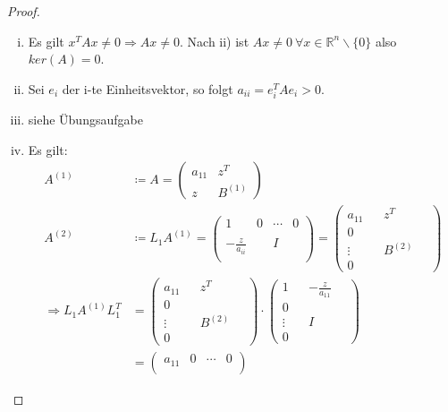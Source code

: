 \documentclass[ngerman,fontsize=11pt, paper=a4, parskip=half, titlepage=true, toc=bib]{scrbook}
\theoremstyle{definition}
\theoremstyle{plain}
\newcommand{\Ren}{\mathds{R}^{n}}
\begin{document}
\begin{proof}~
  \begin{enumerate}[i)]
  \item Es gilt $x^TAx\neq 0\Rightarrow Ax\neq 0$. 
    Nach ii) ist $Ax\neq 0~\forall x\in\Ren\backslash \{0\}$
    also $ker(A)=0$. %
  \item Sei $e_i$ der i-te Einheitsvektor, so folgt $a_{ii} = e_{i}^TAe_i > 0$.
  \item siehe Übungsaufgabe
  \item Es gilt:
    \begin{align*}
      A^{(1)} &\coloneqq A = \begin{pmatrix}
        a_{11} & z^T \\ 
        z			& B^{(1)}
      \end{pmatrix} \\
      A^{(2)}	&\coloneqq L_1 A^{(1)} 
                  = \begin{pmatrix}
                    1 & 0 & \dotsm & 0 \\ \\
                    -\frac{z}{a_{ii}} && I \\ ~
                  \end{pmatrix} 
      = \begin{pmatrix}
        a_{11} &  & z^T & ~ \\ 
        0 \\
        \vdots && B^{(2)} \\ 
        0
      \end{pmatrix} \\
      \Rightarrow L_1A^{(1)}L_1^T  
              &= \begin{pmatrix}
                a_{11} &  & z^T & ~ \\ 
                0 \\
                \vdots && B^{(2)} \\ 
                0
              \end{pmatrix} 
      \cdot  \begin{pmatrix}
        1 &  &	-\frac{z}{a_{11}} & ~ \\ 
        0 \\
        \vdots && I \\ 
        0
      \end{pmatrix}\\
              &= \begin{pmatrix}
                a_{11} & 0 & \cdots & 0\\ 

\end{pmatrix}
\end{align*}
\end{enumerate}
\end{proof}
\end{document}
